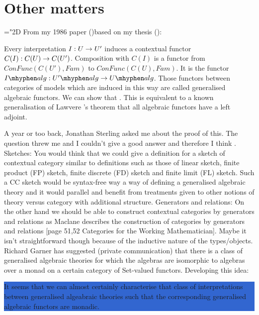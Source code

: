 \documentclass[10pt,a4paper]{article}
\theoremstyle{remark}
\newcommand{\highlightpara}[1]{\colorbox{highlight}{%
    \parbox{\dimexpr\linewidth-2\fboxsep}%
        {#1}}
}
\begin{document}
\section{Other matters}
\mathchardef\mhyphen="2D %
\newcommand{\Ualg}{U \mhyphen alg}
\newcommand{\Upalg}{U' \mhyphen alg}
\newcommand{\Ialg}{I \mhyphen alg}
\note From my 1986 paper (\cite{Cartmell86})based on my thesis (\cite{Cartmell78}):
\begin{tightquote}
Every interpretation $I:U \rightarrow U'$ induces a contextual functor 
$C(I):C(U) \rightarrow C(U')$. Composition with $C(I)$ is a functor from 
$ConFunc(C(U'),Fam)$ to
$ConFunc(C(U),Fam)$. It is the functor $\Ialg:\Upalg \morph \Ualg$. Those functors
between categories of models which are induced in this way are called generalised
algebraic functors. We can show that .
This is
equivalent to a known generalisation of Lawvere \cite{LawvereAlgebraicTheories}'s theorem that all algebraic
functors have a left adjoint. 
\end{tightquote}
A year or too back, Jonathan Sterling asked me about the proof of this. The question threw me and I couldn't give a good answer and therefore I think .
\note
Sketches: You would think that we could give a definition for a sketch of contextual category 
similar to  definitions such as those of linear sketch, finite product (FP) sketch, finite discrete (FD) sketch and finite limit (FL) sketch. Such a CC sketch would be syntax-free way a way of defining a generalised algebraic theory and it would parallel and benefit from treatments given to other notions of theory versus category with additional structure. 
\note
Generators and relations: On the other hand we should be able to construct contextual categories by generators and  
relations as Maclane describes the construction of categories by generators and relations
[page 51,52 Categories for the Working Mathematician]. Maybe it isn't  straightforward  though because of the inductive nature of the types/objects. 
\note Richard Garner has suggested (private communication) that there is a class of generalised algebraic theories for which the algebras are isomorphic to algebras  over a monad on a certain category of Set-valued functors. Developing this idea: 

\noindent
\highlightpara{It seems that we can almost certainly characterise that class of interpretations between 
generalised algeabraic theories such that the corresponding generalised algebraic functors are monadic.}
\end{document}
